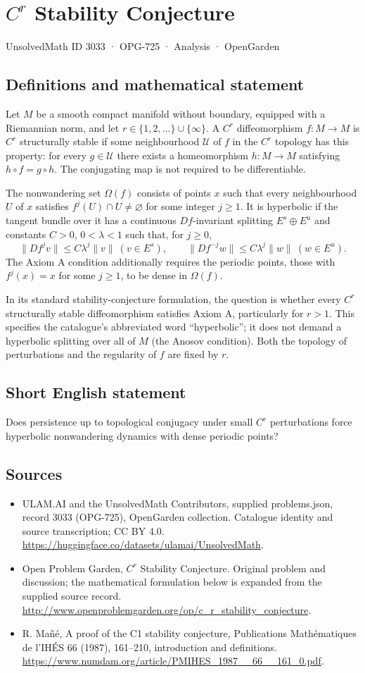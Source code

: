 \documentclass[11pt,a4paper]{article}
\begin{document}
\section*{$C^r$ Stability Conjecture}\label{3033}
{\small UnsolvedMath ID 3033 · OPG-725 · Analysis · OpenGarden}
\subsection{Definitions and mathematical statement}
Let $M$ be a smooth compact manifold without boundary, equipped with a
Riemannian norm, and let $r\in\{1,2,\ldots\}\cup\{\infty\}$.
A $C^r$ diffeomorphism $f:M\to M$ is $C^r$ structurally stable if some
neighbourhood $\mathcal U$ of $f$ in the $C^r$ topology has this property:
for every $g\in\mathcal U$ there exists a homeomorphism $h:M\to M$ satisfying
$h\circ f=g\circ h$. The conjugating map is not required to be differentiable.

The nonwandering set $\Omega(f)$ consists of points $x$ such that every
neighbourhood $U$ of $x$ satisfies $f^j(U)\cap U\ne\varnothing$ for some
integer $j\ge1$. It is hyperbolic if the tangent bundle over it has a continuous
$Df$-invariant splitting $E^s\oplus E^u$ and constants $C>0$, $0<\lambda<1$
such that, for $j\ge0$,
\[
 \|Df^j v\|\le C\lambda^j\|v\|\ (v\in E^s),\qquad
 \|Df^{-j}w\|\le C\lambda^j\|w\|\ (w\in E^u).
\]
The Axiom A condition additionally requires the periodic points, those with
$f^j(x)=x$ for some $j\ge1$, to be dense in $\Omega(f)$.

In its standard stability-conjecture formulation, the question is whether
every $C^r$ structurally stable diffeomorphism satisfies Axiom A, particularly
for $r>1$. This specifies the catalogue's abbreviated word ``hyperbolic'';
it does not demand a hyperbolic splitting over all of $M$ (the Anosov
condition). Both the topology of perturbations and the regularity of $f$
are fixed by $r$.
\subsection{Short English statement}
Does persistence up to topological conjugacy under small $C^r$ perturbations force hyperbolic nonwandering dynamics with dense periodic points?
\subsection{Sources}
\begin{itemize}
\item[S1] ULAM.AI and the UnsolvedMath Contributors, supplied problems.json, record 3033 (OPG-725), OpenGarden collection. Catalogue identity and source transcription; CC BY 4.0.
\url{https://huggingface.co/datasets/ulamai/UnsolvedMath}.
\item[S2] Open Problem Garden, $C^r$ Stability Conjecture. Original problem and discussion; the mathematical formulation below is expanded from the supplied source record.
\url{http://www.openproblemgarden.org/op/c_r_stability_conjecture}.
\item[S3] R. Mañé, A proof of the C1 stability conjecture, Publications Mathématiques de l’IHÉS 66 (1987), 161–210, introduction and definitions.
\url{https://www.numdam.org/article/PMIHES_1987__66__161_0.pdf}.
\end{itemize}
\end{document}
